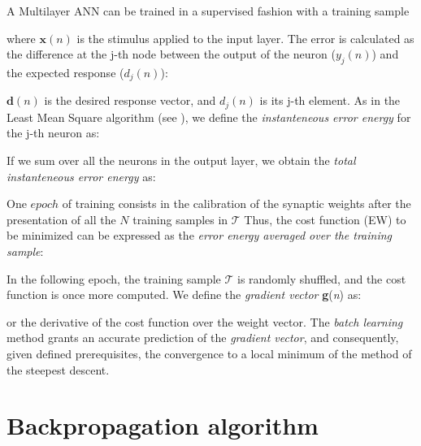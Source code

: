 A Multilayer \acs{ANN} can be trained in a supervised fashion with a training
sample

where $\mathbf{x}(n)$ is the stimulus applied to the input layer.
The error is calculated 
as the difference at the j-th
node between the output of the neuron ($y_j(n)$) and the expected response
($d_j(n)$):

$\mathbf{d}(n)$ is the desired response vector, and $d_j(n)$ is its j-th
element.
As in the Least Mean Square algorithm (see \citet{RefWorks:158}), we define
the \textit{instanteneous error energy} for the j-th neuron as:

If we sum over all the neurons in the output layer, we obtain
the \textit{total instanteneous error energy} as:

One $epoch$ of training consists in the calibration of the synaptic weights
after the presentation of all the $N$ training samples in $\mathscr{T}$
Thus,
the cost function (\acs{EW}) to be minimized can be
expressed as the \textit{error energy averaged over the training sample}:

In the following epoch, the training sample $\mathscr{T}$ is randomly shuffled,
and the cost function is once more computed.
We define the \textit{gradient vector}
\textbf{g}(\textit{n}) as:

or the derivative of the cost function over the  weight vector.
The \textit{batch learning} method grants an accurate prediction of the
\textit{gradient vector}, and consequently, given defined prerequisites, the
convergence to a local minimum of the method of the steepest descent.


\section{Backpropagation algorithm}
\label{sec:backpropagationalgorithm}

